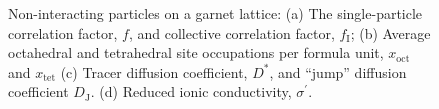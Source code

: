 \documentclass[aps,prb,twocolumn,superscriptaddress,reprint]{revtex4-1}
\newcommand{\m}[1]{\mathrm{#1}}
\begin{document}
\begin{figure}[tb]
  \centering
    \caption{\label{fig:non-interacting_data}Non-interacting particles on a garnet lattice: (a) The single-particle correlation factor, $f$, and collective correlation factor, $f_\m{I}$; (b) Average octahedral and tetrahedral site occupations per formula unit, $x_\m{oct}$ and $x_\m{tet}$ (c) Tracer diffusion coefficient, $D^*$, and ``jump'' diffusion coefficient $D_\m{J}$. (d) Reduced ionic conductivity, $\sigma^\prime$.}
\end{figure}
\end{document}
